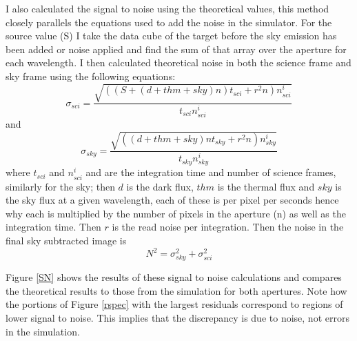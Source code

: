 \documentclass[11pt,twoside]{article}
\begin{document}
 I also calculated the signal to noise using the theoretical values, this method closely parallels the equations used to add the noise in the simulator. For the source value (S) I take the data cube of the target before the sky emission has been added or noise applied and find the sum of that array over the aperture for each wavelength. I then calculated theoretical noise in both the science frame and sky frame using the following equations: 
\begin{equation} \sigma_{sci}=\frac{\sqrt{((S+(d+thm+sky)n)t_{sci}+r^2n)n^i_{sci}}}{t_{sci}n^i_{sci}} \label{noise1}\end{equation} and \begin{equation} \sigma_{sky}=\frac{\sqrt{((d+thm+sky)nt_{sky}+r^2n)n^i_{sky}}}{t_{sky}n^i_{sky}} \label{noise2}\end{equation} where $t_{sci}$ and $n^i_{sci}$ and are the integration time and number of science frames, similarly for the sky; then $d$ is the dark flux, $thm$ is the thermal flux  and $sky$ is the sky flux at a given wavelength, each of these is per pixel per seconds hence why each is multiplied by the number of pixels in the aperture (n) as well as the integration time. Then $r$ is the read noise per integration. 
Then the noise in the final sky subtracted image is
\begin{equation}N^2=\sigma_{sky}^2+\sigma_{sci}^2 \label{noise3}\end{equation}

Figure \ref{SN} shows the results of these signal to noise calculations and compares the theoretical results to those from the simulation for both apertures. Note how the portions of Figure \ref{rspec} with the largest residuals correspond to regions of lower signal to noise. This implies that the discrepancy is due to noise, not errors in the simulation.
\end{document}
